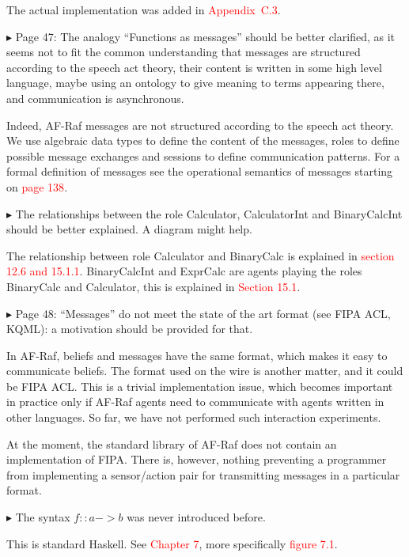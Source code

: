 \documentclass{article}
\newcommand*\R[1]{\textcolor{red}{#1}} %
\newenvironment{them}%
  {\bigskip\noindent\begingroup\color{blue}$\blacktriangleright$\enspace}%
  {\endgroup\par}
\begin{document}
The actual implementation was added in \R{Appendix~C.3}.

\begin{them}
Page 47:
The analogy ``Functions as messages'' should be better clarified, as it seems not
to fit the common understanding that messages are structured according to the
speech act theory, their content is written in some high level language, maybe
using an ontology to give meaning to terms appearing there, and communication
is asynchronous.
\end{them}
Indeed, AF-Raf messages are not structured according to  the speech act
theory.  We use algebraic data types to define the content of the messages,
roles to define possible message exchanges and sessions to define communication
patterns. For a formal definition of messages see the operational semantics of
messages starting on \R{page 138}.

\begin{them}
The relationships between the role Calculator, CalculatorInt and BinaryCalcInt
should be better explained. A diagram might help.
\end{them}
The relationship between role Calculator and BinaryCalc is explained in
\R{section 12.6 and 15.1.1}. BinaryCalcInt and ExprCalc are agents playing the
roles BinaryCalc and Calculator, this is explained in \R{Section 15.1}.

\begin{them}
Page 48:
``Messages'' do not meet the state of the art format (see FIPA ACL, KQML): a
motivation should be provided for that.
\end{them}

In AF-Raf,
  beliefs and messages have the same format,
  which makes it easy to communicate beliefs.
The format used on the wire is another matter,
  and it could be FIPA ACL\null.
This is a trivial implementation issue,
  which becomes important in practice only if AF-Raf agents
  need to communicate with agents written in other languages.
So far, we have not performed such interaction experiments.

At the moment,
  the standard library of AF-Raf does not contain an implementation of FIPA\null.
There is, however,
  nothing preventing a programmer from implementing a sensor/action pair
  for transmitting messages in a particular format.


\begin{them}
The syntax $f::a->b$ was never introduced before.
\end{them}
This is standard Haskell. See \R{Chapter 7}, more specifically \R{figure 7.1}.
\end{document}
